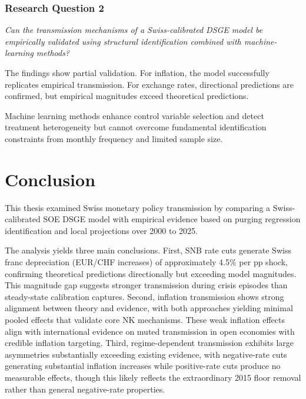 \documentclass[12pt,a4paper]{article}
\begin{document}
\subsubsection{Research Question 2}
\textit{Can the transmission mechanisms of a Swiss-calibrated DSGE model be empirically validated using structural identification combined with machine-learning methods?}

The findings show partial validation. For inflation, the model successfully replicates empirical transmission. For exchange rates, directional predictions are confirmed, but empirical magnitudes exceed theoretical predictions.

Machine learning methods enhance control variable selection and detect treatment heterogeneity but cannot overcome fundamental identification constraints from monthly frequency and limited sample size.

\section{Conclusion}
\label{sec:conclusion}

This thesis examined Swiss monetary policy transmission by comparing a Swiss-calibrated SOE DSGE model with empirical evidence based on purging regression identification and local projections over 2000 to 2025. 

The analysis yields three main conclusions. First, SNB rate cuts generate Swiss franc depreciation (EUR/CHF increases) of approximately 4.5\% per pp shock, confirming theoretical predictions directionally but exceeding model magnitudes. This magnitude gap suggests stronger transmission during crisis episodes than steady-state calibration captures. Second, inflation transmission shows strong alignment between theory and evidence, with both approaches yielding minimal pooled effects that validate core NK mechanisms. These weak inflation effects align with international evidence on muted transmission in open economies with credible inflation targeting. Third, regime-dependent transmission exhibits large asymmetries substantially exceeding existing evidence, with negative-rate cuts generating substantial inflation increases while positive-rate cuts produce no measurable effects, though this likely reflects the extraordinary 2015 floor removal rather than general negative-rate properties.
\end{document}
